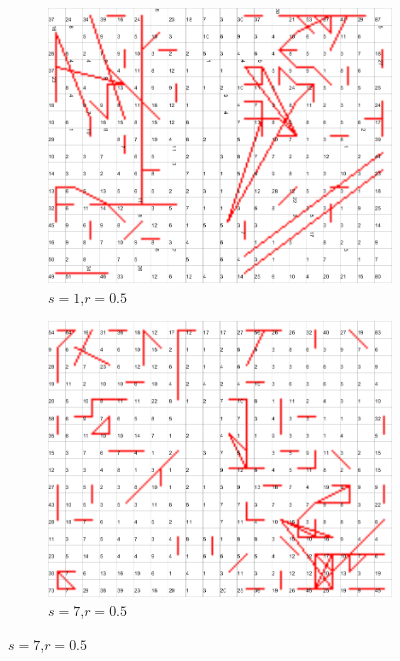 \documentclass{acm_proc_article-sp}
\begin{document}
\begin{figure}
\centering
    \centering
    \begin{subfigure}[b]{0.30\linewidth}
        \includegraphics[width=\linewidth]{img/wine-newmid-radius-neighbourhood-graph--r-05-seed-1}
        \caption{$s=1$,$r=0.5$}
        \label{fig:wine-newmid-radius-neighbourhood-graph--r-05-seed-1}
    \end{subfigure}
    \begin{subfigure}[b]{0.30\linewidth}
        \includegraphics[width=\linewidth]{img/wine-newmid-radius-neighbourhood-graph--r-05-seed-7}
        \caption{$s=7$,$r=0.5$}

\end{subfigure}
\end{figure}
\end{document}

